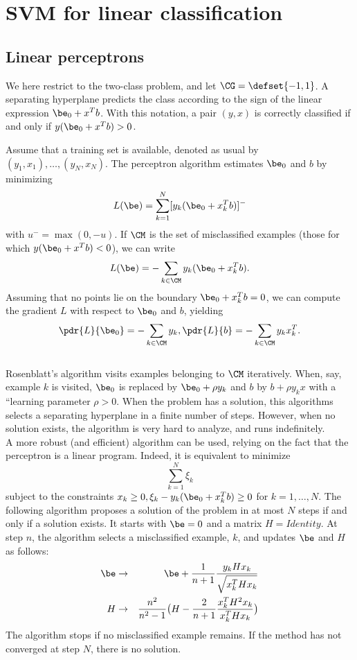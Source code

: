 \section{SVM for linear classification}

\subsection{Linear perceptrons}
We here restrict to the two-class problem, and let $\CG =
\defset{-1,1}$. A separating hyperplane predicts the class according
to the sign of the linear expression $\be_0 + x^T b$. With this
notation, a pair $(y,x)$ is correctly classified if and only if
$y(\be_0 + x^T b) > 0$.

Assume that a training set is available, denoted as usual by $(y_1,
x_1), \ldots, (y_N, x_N)$. 
The perceptron algorithm estimates $\be_0$ and $b$ by minimizing 
$$
L(\be) = \sum_{k=1}^N [y_k(\be_0 + x_k^T b)]^-
$$
with $u^- = \max(0, -u)$. If $\CM$ is the set of misclassified
examples (those for which $y(\be_0 + x^T b) < 0$), we can write
$$
L(\be) =- \sum_{k\in\CM} y_k(\be_0 + x_k^T b).
$$
Assuming that no points lie on the boundary $\be_0 + x_k^T b = 0$, we
can compute the gradient $L$ with respect to $\be_0$ and $b$, yielding
$$
\pdr{L}{\be_0} = - \sum_{k\in\CM} y_k, \hfill \pdr{L}{b} = -
\sum_{k\in\CM} y_kx_k^T.
$$\\

Rosenblatt's algorithm visits examples belonging to $\CM$
iteratively. When, say, example $k$ is visited, $\be_0$ is replaced by
$\be_0 + \rho y_k$ and $b$ by $b + \rho y_k x$ with a ``learning
parameter $\rho>0$. When the problem has a solution, this algorithms selects a
separating hyperplane in a finite number of steps. 
However, when no solution
exists, the algorithm is very hard to analyze, and runs
indefinitely. \\

A more robust (and efficient) algorithm can be used, relying on the
fact that the perceptron is a linear program. Indeed, it is equivalent
to minimize
$$
\sum_{k=1}^N \xi_k
$$
subject to the constraints $x_k\geq 0, \xi_k-y_k(\be_0 + x_k^Tb) \geq
0$ for $k=1, \ldots, N$. The following algorithm proposes a solution
of the problem in at most $N$ steps if and only if a solution
exists. It starts with $\be = 0$ and a matrix $H = \mathit{Identity}$. At step $n$, the algorithm
selects a misclassified example, $k$, and updates $\be$ and $H$ as
follows:
\begin{eqnarray*}
\be &\to& \be + \frac{1}{n+1} \frac{y_kHx_k}{\sqrt{x_k^THx_k}}\\
H &\to& \frac{n^2}{n^2-1}\big(H - \frac{2}{n+1} \frac{x_k^TH^2x_k}{x_k^THx_k}\big)
\end{eqnarray*}
The algorithm stops if no misclassified example remains. If the method
has not converged at step $N$, there is no solution.

